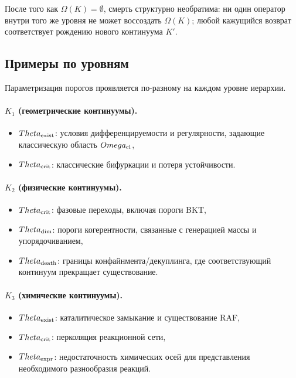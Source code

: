 После того как \(\Omega(K)=\emptyset\), смерть структурно необратима:
ни один оператор внутри того же уровня не может воссоздать \(\Omega(K)\);
любой кажущийся возврат соответствует рождению нового континуума \(K'\).

\subsection{Примеры по уровням}

Параметризация порогов проявляется по-разному на каждом уровне иерархии.

\paragraph{\texorpdfstring{\(K_1\)}{K_1} (геометрические континуумы).}
\begin{itemize}
    \item \(\Theta_{\rm exist}\): условия дифференцируемости и регулярности,
          задающие классическую область \(\Omega_{\rm cl}\),
    \item \(\Theta_{\rm crit}\): классические бифуркации и потеря устойчивости.
\end{itemize}

\paragraph{\texorpdfstring{\(K_2\)}{K_2} (физические континуумы).}
\begin{itemize}
    \item \(\Theta_{\rm crit}\): фазовые переходы, включая пороги BKT,
    \item \(\Theta_{\rm dim}\): пороги когерентности, связанные с
          генерацией массы и упорядочиванием,
    \item \(\Theta_{\rm death}\): границы конфайнмента/декуплинга, где
          соответствующий континуум прекращает существование.
\end{itemize}

\paragraph{\texorpdfstring{\(K_3\)}{K_3} (химические континуумы).}
\begin{itemize}
    \item \(\Theta_{\rm exist}\): каталитическое замыкание и существование RAF,
    \item \(\Theta_{\rm crit}\): перколяция реакционной сети,
    \item \(\Theta_{\rm expr}\): недостаточность химических осей для представления
          необходимого разнообразия реакций.
\end{itemize}

